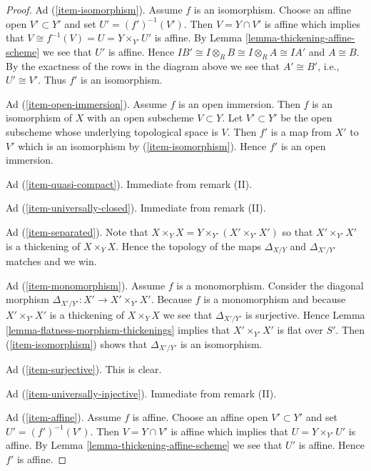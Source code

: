 \begin{proof}
\medskip\noindent
Ad (\ref{item-isomorphism}). Assume $f$ is an isomorphism. Choose an
affine open $V' \subset Y'$ and set $U' = (f')^{-1}(V')$. Then
$V = Y \cap V'$ is affine which implies that
$V \cong f^{-1}(V) = U = Y \times_{Y'} U'$ is affine. By
Lemma \ref{lemma-thickening-affine-scheme}
we see that $U'$ is affine. Hence $IB' \cong I \otimes_R B \cong
I \otimes_R A \cong IA'$ and $A \cong B$. By the exactness of the rows
in the diagram above we see that $A' \cong B'$,
i.e., $U' \cong V'$. Thus $f'$ is an isomorphism.

\medskip\noindent
Ad (\ref{item-open-immersion}). Assume $f$ is an open immersion.
Then $f$ is an isomorphism of $X$ with an open subscheme $V \subset Y$.
Let $V' \subset Y'$ be the open subscheme whose underlying topological
space is $V$. Then $f'$ is a map from $X'$ to $V'$ which is an isomorphism by
(\ref{item-isomorphism}). Hence $f'$ is an open immersion.

\medskip\noindent
Ad (\ref{item-quasi-compact}). Immediate from remark (II).

\medskip\noindent
Ad (\ref{item-universally-closed}). Immediate from remark (II).

\medskip\noindent
Ad (\ref{item-separated}). Note that
$X \times_Y X = Y \times_{Y'} (X' \times_{Y'} X')$ so that
$X' \times_{Y'} X'$ is a thickening of $X \times_Y X$.
Hence the topology of the maps $\Delta_{X/Y}$ and $\Delta_{X'/Y'}$
matches and we win.

\medskip\noindent
Ad (\ref{item-monomorphism}). Assume $f$ is a monomorphism.
Consider the diagonal morphism $\Delta_{X'/Y'} : X' \to X' \times_{Y'} X'$.
Because $f$ is a monomorphism and because
$X' \times_{Y'} X'$ is a thickening of $X \times_Y X$ we see that
$\Delta_{X'/Y'}$ is surjective. Hence
Lemma \ref{lemma-flatness-morphism-thickenings}
implies that $X' \times_{Y'} X'$ is flat over $S'$. Then
(\ref{item-isomorphism}) shows that $\Delta_{X'/Y'}$ is an
isomorphism.

\medskip\noindent
Ad (\ref{item-surjective}). This is clear.

\medskip\noindent
Ad (\ref{item-universally-injective}). Immediate from remark (II).

\medskip\noindent
Ad (\ref{item-affine}). Assume $f$ is affine.  Choose an
affine open $V' \subset Y'$ and set $U' = (f')^{-1}(V')$.
Then $V = Y \cap V'$ is affine which implies that
$U = Y \times_{Y'} U'$ is affine. By
Lemma \ref{lemma-thickening-affine-scheme}
we see that $U'$ is affine. Hence $f'$ is affine.


\end{proof}
